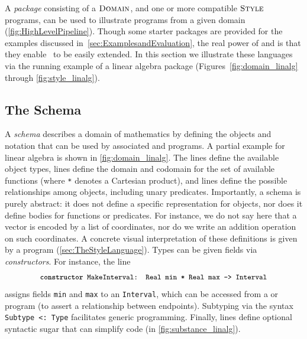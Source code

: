 A \emph{package} consisting of a \(\textsc{Domain}{}\), and one or more compatible \(\textsc{Style}{}\) programs, can be used to illustrate \Substance{} programs from a given domain (\cref{fig:HighLevelPipeline}).  Though some starter packages are provided for the examples discussed in~\cref{sec:ExamplesandEvaluation}, the real power of \Style{} and \Domain{} is that they enable \Penrose\ to be easily extended.  In this section we illustrate these languages via the running example of a linear algebra package (Figures~\ref{fig:domain_linalg} through \ref{fig:style_linalg}).  



\subsection{The \Domain{} Schema}
\label{sec:TheDomainSchema}

A \Domain{} \emph{schema} describes a domain of mathematics by defining the objects and notation that can be used by associated \Substance{} and \Style{} programs.  A partial example for linear algebra is shown in \cref{fig:domain_linalg}.  The  lines define the available object types,  lines define the domain and codomain for the set of available functions (where \texttt{*} denotes a Cartesian product), and  lines define the possible relationships among objects, including unary predicates.  Importantly, a \Domain{} schema is purely abstract: it does not define a specific representation for objects, nor does it define bodies for functions or predicates. For instance, we do not say here that a vector is encoded by a list of coordinates, nor do we write an addition operation on such coordinates.  A concrete visual interpretation of these definitions is given by a \Style{} program (\cref{sec:TheStyleLanguage}).  Types can be given fields via \emph{constructors}. For instance, the line
\[
   \text{\small\texttt{\textbf{constructor} MakeInterval: Real min * Real max -> Interval}}
\]
assigns fields \texttt{min} and \texttt{max} to an \texttt{Interval}, which can be accessed from a \Substance{} or \Style{} program (\eg to assert a relationship between endpoints).  Subtyping via the syntax \texttt{Subtype <: Type} facilitates generic programming.  Finally,  lines define optional syntactic sugar that can simplify code (\eg in \cref{fig:substance_linalg}).

